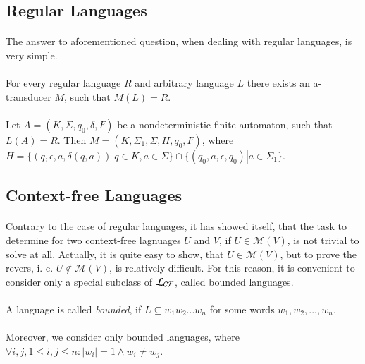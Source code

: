 \subsection{Regular Languages}
\paragraph{}
The answer to aforementioned question, when dealing with regular languages, is very simple.

\paragraph{}
\cveta For every regular language $R$ and arbitrary language $L$ there exists an a-transducer $M$, such that $M(L) = R$.

\paragraph{}
\dokaz Let $A = (K, \Sigma, q_{0}, \delta, F)$ be a nondeterministic finite automaton, such that $L(A) = R$. Then $M=(K, \Sigma_{1}, \Sigma, H, q_{0}, F)$, where $H=\{ (q, \epsilon , a, \delta (q,a)) | q \in K, a \in \Sigma \} \cap \{ (q_{0}, a, \epsilon, q_{0}) | a \in \Sigma_{1} \} $. \square

\subsection{Context-free Languages}
\paragraph{}
Contrary to the case of regular languages, it has showed itself, that the task to determine for two context-free lagnuages $U$ and $V$, if $U \in \mathcal{M}(V)$, is not trivial to solve at all. Actually, it is quite easy to show, that $U \in \mathcal{M}(V)$, but to prove the revers, i. e. $U \notin \mathcal{M}(V)$, is relatively difficult. For this reason, it is convenient to consider only a special subclass of $\CF $, called bounded languages.

\paragraph{}
 A language is called \emph{bounded}, if $L \subseteq w_{1}w_{2}...w_{n}$ for some words $w_{1}, w_{2}, ..., w_{n}$.

\paragraph{}
Moreover, we consider only bounded languages, where $\forall i, j, 1 \leq i,j \leq n: |w_{i}| = 1 \wedge w_{i} \neq w_{j}$. 

